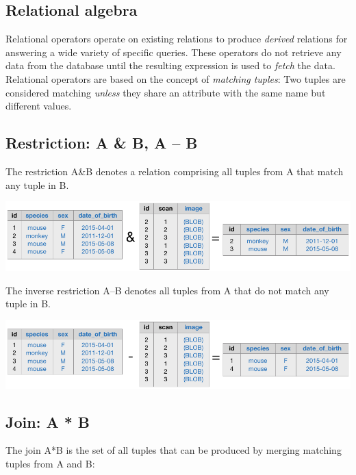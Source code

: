 \begin{table}
\begin{boxedminipage}{\textwidth}
\section*{Relational algebra}

Relational operators operate on existing relations to produce \emph{derived} relations for answering a wide variety of specific queries.
These operators do not retrieve any data from the database until the resulting expression is used to \emph{fetch} the data.
Relational operators are based on the concept of \emph{matching tuples}: 
Two tuples are considered matching  \emph{unless} they share an attribute with the same name but different values.

\subsection*{Restriction:  {\sf A \& B}, {\sf A -- B}}
The restriction A\&B denotes a relation comprising all tuples from A that match any tuple in {\sf B}.  

\begin{center}
\includegraphics{./figures/restriction.pdf}
\end{center}

The inverse restriction {\sf A--B} denotes all tuples from {\sf A} that do not match any tuple in {\sf B}.

\begin{center}
\includegraphics{./figures/antijoin.pdf}
\end{center}


\subsection*{Join: {\sf A * B}}
The join {\sf A*B} is the set of all tuples that can be produced by merging matching tuples from {\sf A} and {\sf B}:


\end{boxedminipage}
\end{table}
